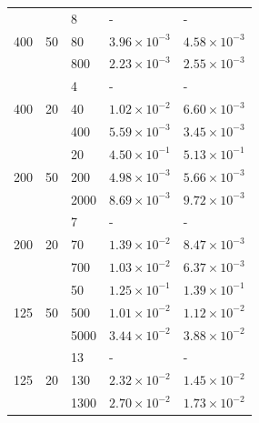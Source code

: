 \begin{table}
\begin{tabular}{lllll}
    \hline
    \multirow{3}{*}{ 400}  & \multirow{3}{*}{ 50} & 8    & - & -                                         \\
                           &                      & 80   & $3.96 \times 10^{-3}$ & $4.58 \times 10^{-3}$ \\
                           &                      & 800  & $2.23 \times 10^{-3}$ & $2.55 \times 10^{-3}$ \\
    \hline
    \multirow{3}{*}{ 400}  & \multirow{3}{*}{ 20} & 4    & - & -                                         \\
                           &                      & 40   & $1.02 \times 10^{-2}$ & $6.60 \times 10^{-3}$ \\
                           &                      & 400  & $5.59 \times 10^{-3}$ & $3.45 \times 10^{-3}$ \\
    \hline
    \multirow{3}{*}{ 200}  & \multirow{3}{*}{ 50} & 20   & $4.50 \times 10^{-1}$ & $5.13 \times 10^{-1}$ \\
                           &                      & 200  & $4.98 \times 10^{-3}$ & $5.66 \times 10^{-3}$ \\
                           &                      & 2000 & $8.69 \times 10^{-3}$ & $9.72 \times 10^{-3}$ \\
    \hline
    \multirow{3}{*}{ 200}  & \multirow{3}{*}{ 20} & 7    & - & -                                         \\
                           &                      & 70   & $1.39 \times 10^{-2}$ & $8.47 \times 10^{-3}$ \\
                           &                      & 700  & $1.03 \times 10^{-2}$ & $6.37 \times 10^{-3}$ \\
    \hline
    \multirow{3}{*}{ 125}  & \multirow{3}{*}{ 50} & 50   & $1.25 \times 10^{-1}$ & $1.39 \times 10^{-1}$ \\
                           &                      & 500  & $1.01 \times 10^{-2}$ & $1.12 \times 10^{-2}$ \\
                           &                      & 5000 & $3.44 \times 10^{-2}$ & $3.88 \times 10^{-2}$ \\
    \hline
    \multirow{3}{*}{ 125}  & \multirow{3}{*}{ 20} & 13   & - & -                                         \\
                           &                      & 130  & $2.32 \times 10^{-2}$ & $1.45 \times 10^{-2}$ \\
                           &                      & 1300 & $2.70 \times 10^{-2}$ & $1.73 \times 10^{-2}$ \\

\end{tabular}
\end{table}

